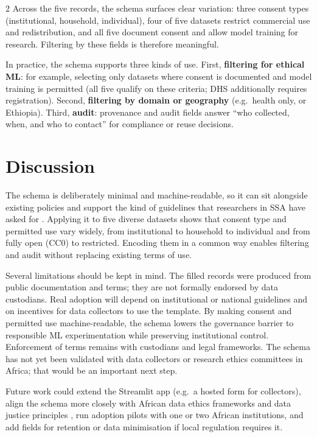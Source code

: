 \documentclass[11pt]{article}
\begin{document}
\begin{multicols}{2}
Across the five records, the schema surfaces clear variation: three consent types (institutional, household, individual), four of five datasets restrict commercial use and redistribution, and all five document consent and allow model training for research. Filtering by these fields is therefore meaningful.

In practice, the schema supports three kinds of use. First, \textbf{filtering for ethical ML}: for example, selecting only datasets where consent is documented and model training is permitted (all five qualify on these criteria; DHS additionally requires registration). Second, \textbf{filtering by domain or geography} (e.g.\ health only, or Ethiopia). Third, \textbf{audit}: provenance and audit fields answer ``who collected, when, and who to contact'' for compliance or reuse decisions.

\section{Discussion}
\label{sec:discussion}

The schema is deliberately minimal and machine-readable, so it can sit alongside existing policies \cite{effoduh2024} and support the kind of guidelines that researchers in SSA have asked for \cite{brown2024,chabilall2024}. Applying it to five diverse datasets shows that consent type and permitted use vary widely, from institutional to household to individual and from fully open (CC0) to restricted. Encoding them in a common way enables filtering and audit without replacing existing terms of use.

Several limitations should be kept in mind. The filled records were produced from public documentation and terms; they are not formally endorsed by data custodians. Real adoption will depend on institutional or national guidelines and on incentives for data collectors to use the template. By making consent and permitted use machine-readable, the schema lowers the governance barrier to responsible ML experimentation while preserving institutional control. Enforcement of terms remains with custodians and legal frameworks. The schema has not yet been validated with data collectors or research ethics committees in Africa; that would be an important next step.

Future work could extend the Streamlit app (e.g.\ a hosted form for collectors), align the schema more closely with African data ethics frameworks \cite{barrett2025} and data justice principles \cite{munung2025}, run adoption pilots with one or two African institutions, and add fields for retention or data minimisation if local regulation requires it.


\end{multicols}
\end{document}
